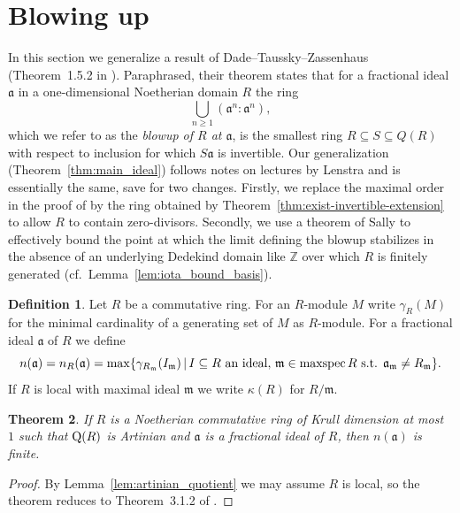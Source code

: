 \documentclass{amsart}
\theoremstyle{plain}
\newtheorem{theorem}{Theorem}[section]
\theoremstyle{definition}
\newtheorem{definition}[theorem]{Definition}
\DeclareMathOperator{\maxspec}{maxspec}
\newcommand{\Z}{\ensuremath{\mathbb{Z}}}
\newcommand{\m}{\ensuremath{\mathfrak{m}}}
\newcommand{\fm}{\ensuremath{\mathfrak{m}}}
\begin{document}
\section{Blowing up}\label{sec:blowing_up}


In this section we generalize a result of Dade--Taussky--Zassenhaus (Theorem~1.5.2 in \cite{Dade-Zassenhaus}).
Paraphrased, their theorem states that for a fractional ideal $\mathfrak{a}$ in a one-dimensional Noetherian domain $R$ the ring
\[ \bigcup_{n\geq 1} (\mathfrak{a}^n : \mathfrak{a}^n),  \]
which we refer to as the \emph{blowup of $R$ at $\mathfrak{a}$}, is the smallest ring $R\subseteq S\subseteq Q(R)$ with respect to inclusion for which $S\mathfrak{a}$ is invertible.
Our generalization (Theorem~\ref{thm:main_ideal}) follows notes on lectures by Lenstra \cite{lecture} and is essentially the same, save for two changes. 
Firstly, we replace the maximal order in the proof of \cite{lecture} by the ring obtained by Theorem~\ref{thm:exist-invertible-extension} to allow $R$ to contain zero-divisors.
Secondly, we use a theorem of Sally \cite{generators} to effectively bound the point at which the limit defining the blowup stabilizes in the absence of an underlying Dedekind domain like $\Z$ over which $R$ is finitely generated (cf.\ Lemma~\ref{lem:iota_bound_basis}).

\begin{definition}
Let \(R\) be a commutative ring. For an \(R\)-module \(M\) write \(\gamma_R(M)\) for the minimal cardinality of a generating set of \(M\) as \(R\)-module.
For a fractional ideal \(\mathfrak{a}\) of \(R\) we define 
\[n(\mathfrak{a})=n_R(\mathfrak{a})=\max\{ \gamma_{R_\m}(I_\m) \,|\, I\subseteq R\textup{ an ideal},\, \m\in\maxspec R \textup{ s.t. }\mathfrak{a}_\m \neq R_\m \}.\] 
If \(R\) is local with maximal ideal \(\fm\) we write \(\kappa(R)\) for \(R/\fm\).
\end{definition}

\begin{theorem}\label{thm:finite_local_generators}
If \(R\) is a Noetherian commutative ring of Krull dimension at most \(1\) such that \(\textup{Q}(R)\) is Artinian and \(\mathfrak{a}\) is a fractional ideal of \(R\), then \(n(\mathfrak{a})\) is finite.
\end{theorem}
\begin{proof}
By Lemma~\ref{lem:artinian_quotient} we may assume \(R\) is local, so the theorem reduces to Theorem~3.1.2 of \cite{generators}.
\end{proof}
\end{document}
